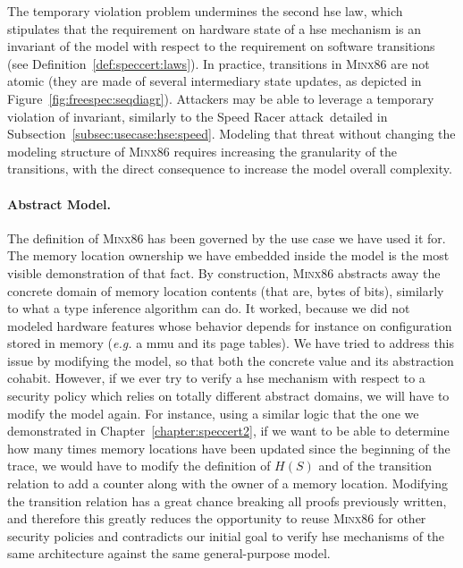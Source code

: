 The temporary violation problem undermines the second \ac{hse} law, which
stipulates that the requirement on hardware state of a \ac{hse} mechanism is an
invariant of the model with respect to the requirement on software transitions
(see Definition~\ref{def:speccert:laws}).
%
In practice, transitions in {\scshape Minx86} are not atomic (they are made of
several intermediary state updates, as depicted in
Figure~\ref{fig:freespec:seqdiagr}).
%
Attackers may be able to leverage a temporary violation of invariant, similarly
to the Speed Racer attack\,\cite{kallenberg2015racecondition} detailed in
Subsection~\ref{subsec:usecase:hse:speed}.
%
Modeling that threat without changing the modeling structure of {\scshape
  Minx86} requires increasing the granularity of the transitions, with the
direct consequence to increase the model overall complexity.

\paragraph{Abstract Model.}
%
The definition of {\scshape Minx86} has been governed by the use case we have
used it for.
%
The memory location ownership we have embedded inside the model is the most
visible demonstration of that fact.
%
By construction, {\scshape Minx86} abstracts away the concrete domain of memory
location contents (that are, bytes of bits), similarly to what a type inference
algorithm can do.
%
It worked, because we did not modeled hardware features whose behavior depends
for instance on configuration stored in memory (\emph{e.g.} a \ac{mmu} and its
page tables).
%
We have tried to address this issue by modifying the model, so that both the
concrete value and its abstraction cohabit.
%
However, if we ever try to verify a \ac{hse} mechanism with respect to a
security policy which relies on totally different abstract domains, we will have
to modify the model again.
%
For instance, using a similar logic that the one we demonstrated in
Chapter~\ref{chapter:speccert2}, if we want to be able to determine how many
times memory locations have been updated since the beginning of the trace, we
would have to modify the definition of \( H(S) \) and of the transition relation
to add a counter along with the owner of a memory location.
%
Modifying the transition relation has a great chance breaking all proofs
previously written, and therefore this greatly reduces the opportunity to reuse
{\scshape Minx86} for other security policies and contradicts our initial goal
to verify \ac{hse} mechanisms of the same architecture against the same
general-purpose model.


